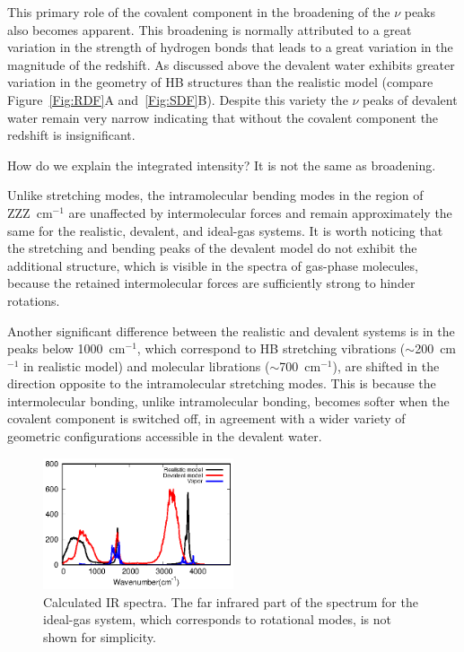 \documentclass[aps,prl,reprint,amsmath,amssymb]{revtex4-1}
\begin{document}
This primary role of the covalent component in the broadening of the $\nu$ peaks also becomes apparent. 
This broadening is normally attributed to a great variation in the strength of hydrogen bonds that leads to a great variation in the magnitude of the redshift. 
As discussed above the devalent water exhibits greater variation in the geometry of HB structures than the realistic model (compare Figure~\ref{Fig:RDF}A and~\ref{Fig:SDF}B). 
Despite this variety the $\nu$ peaks of devalent water remain very narrow indicating that without the covalent component 
the redshift is insignificant. %


\new 
How do we explain the integrated intensity? It is not the same as broadening.
\old 

Unlike stretching modes, the intramolecular bending modes in the region of ZZZ~cm$^{-1}$ are unaffected by intermolecular forces and remain approximately the same for the realistic, devalent, and ideal-gas systems. It is worth noticing that the stretching and bending peaks of the devalent model do not exhibit the additional structure, which is visible in the spectra of gas-phase molecules, because the retained intermolecular forces are sufficiently strong to hinder rotations.

Another significant difference between the realistic and devalent systems is in the peaks below 1000~cm$^{-1}$, which correspond to HB stretching vibrations ($\sim$200~cm$^{-1}$ in realistic model) and molecular librations ($\sim$700~cm$^{-1}$), are shifted in the direction opposite to the intramolecular stretching modes. This is because the intermolecular bonding, unlike intramolecular bonding, becomes softer when the covalent component is switched off, in agreement with a wider variety of geometric configurations accessible in the devalent water. 

\begin{figure}
\centering
\includegraphics[width=0.5\textwidth]{new_ir}
\caption{Calculated IR spectra. The far infrared part of the spectrum for the ideal-gas system, which corresponds to rotational modes, is not shown for simplicity. 
} \label{Fig:IR}
\end{figure}
\end{document}
